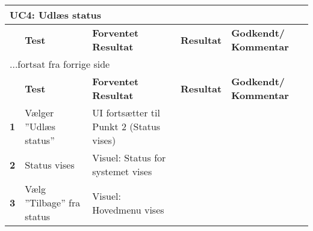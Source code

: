 
\begin{center}
\begin{longtable}{|p{}|p{}|p{}|p{}|p{}|} %
\hline
\multicolumn{5}{|l|}{\textbf{UC4: Udlæs status}} \\ \hline
\multicolumn{1}{|c|}{} &
\textbf{Test} &
\textbf{Forventet \newline Resultat} &
\textbf{Resultat} &
\textbf{Godkendt/ \newline Kommentar} \\ \hline 
\endfirsthead

\multicolumn{5}{l}{...fortsat fra forrige side} \\ \hline 
\multicolumn{1}{|c|}{} &
\textbf{Test} &
\textbf{Forventet \newline Resultat} &
\textbf{Resultat} &
\textbf{Godkendt/ \newline Kommentar} \\ \hline 
\endhead


\textbf{1} &
Vælger ''Udlæs status'' &
UI fortsætter til Punkt 2 (Status vises) &
 &
 \\\hline

\textbf{2} &
Status vises &
Visuel: Status for systemet vises &
 &
 \\\hline
\textbf{3} &
Vælg ''Tilbage'' fra status &
Visuel: Hovedmenu vises &
 &
 \\\hline
	\end{longtable}
	\label{ATUC4} 
\end{center}